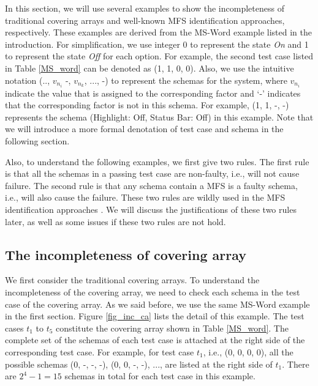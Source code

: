 In this section, we will use several examples to show the incompleteness of traditional covering arrays and well-known MFS identification approaches, respectively. These examples are derived from the MS-Word example listed in the introduction. For simplification, we use integer 0 to represent the state \emph{On} and 1 to represent the state \emph{Off} for each option. For example, the second test case listed in Table \ref{MS_word} can be denoted as (1, 1, 0, 0). Also, we use the intuitive notation (.., $v_{n_{i}}$ -, $v_{n_{k}}$, ..., -) to represent the schemas for the system, where $v_{n_{i}}$ indicate the value that is assigned to the corresponding factor and `-' indicates that the corresponding factor is not in this schema. For example, (1, 1, -, -) represents the schema (Highlight: Off, Status Bar: Off) in this example. Note that we will introduce a more formal denotation of test case and schema in the following section.


Also, to understand the following examples, we first give two rules. The first rule is that all the schemas in a passing test case are non-faulty, i.e., will not cause failure. The second rule is that any schema contain a MFS is a faulty schema, i.e., will also cause the failure. These two rules are wildly used in the MFS identification approaches \cite{nie2011minimal,zhang2011characterizing,ghandehari2012identifying,niu2013identifying}. We will discuss the justifications of these two rules later, as well as some issues if these two rules are not hold.




\subsection{The incompleteness of covering array}

We first consider the traditional covering arrays. To understand the incompleteness of the covering array, we need to check each schema in the test case of the covering array. As we said before, we use the same MS-Word example in the first section.  Figure \ref{fig_inc_ca} lists the detail of this example. The test cases $t_{1}$ to $t_{5}$ constitute the covering array shown in Table \ref{MS_word}. The complete set of the schemas of each test case is attached at the right side of the corresponding test case.  For example, for test case $t_{1}$, i.e., (0, 0, 0, 0), all the possible schemas (0, -, -, -), (0, 0, -, -), ..., are listed at the right side of $t_{1}$. There are $2^{4}-1 = 15$ schemas in total for each test case in this example.

